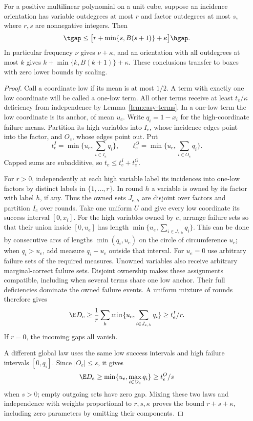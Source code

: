 \begin{theorem}\label{thm:incidence-orientation}
For a positive multilinear polynomial on a unit cube, suppose an incidence
orientation has variable outdegrees at most $r$ and factor outdegrees at
most $s$, where $r,s$ are nonnegative integers. Then
\[
 \tgap\le\bigl[r+\min\{s,B(s+1)\}+\kappa\bigr]\hgap.
\]
In particular frequency $\nu$ gives $\nu+\kappa$, and an orientation with
all outdegrees at most $k$ gives $k+\min\{k,B(k+1)\}+\kappa$.
These conclusions transfer to boxes with zero lower bounds by scaling.
\end{theorem}
\begin{proof}
Call a coordinate low if its mean is at most $1/2$. A term with exactly
one low coordinate will be called a one-low term. All other terms receive
at least $t_e/\kappa$ deficiency from independence by
Lemma~\ref{lem:easy-terms}. In a one-low term the low coordinate is its
anchor, of mean $u_e$. Write $q_i=1-x_i$ for the high-coordinate failure
means. Partition its high variables into $I_e$, whose incidence edges
point into the factor, and $O_e$, whose edges point out. Put
\[
 t_e^I=\min\{u_e,\sum_{i\in I_e}q_i\},\qquad
 t_e^O=\min\{u_e,\sum_{i\in O_e}q_i\}.
\]
Capped sums are subadditive, so $t_e\le t_e^I+t_e^O$.

For $r>0$, independently at each high variable label its incidences into
one-low factors by distinct labels in $\{1,\ldots,r\}$. In round $h$ a
variable is owned by its factor with label $h$, if any. Thus the owned
sets $J_{e,h}$ are disjoint over factors and partition $I_e$ over rounds.
Take one uniform $U$ and give every low coordinate its success interval
$[0,x_i]$. For the high variables owned by $e$, arrange failure sets so
that their union inside $[0,u_e]$ has length
$\min\{u_e,\sum_{i\in J_{e,h}}q_i\}$. This can be done by consecutive
arcs of lengths $\min(q_i,u_e)$ on the circle of circumference $u_e$;
when $q_i>u_e$, add measure $q_i-u_e$ outside that interval. For $u_e=0$
use arbitrary failure sets of the required measures. Unowned variables
also receive arbitrary marginal-correct failure sets. Disjoint ownership
makes these assignments compatible, including when several terms share
one low anchor. Their full deficiencies dominate the owned failure events.
A uniform mixture of rounds therefore gives
\[
 \E D_e\ge\frac1r\sum_h\min\{u_e,\sum_{i\in J_{e,h}}q_i\}
 \ge t_e^I/r.
\]
If $r=0$, the incoming gaps all vanish.

A different global law uses the same low success intervals and high
failure intervals $[0,q_i]$. Since $|O_e|\le s$, it gives
\[
 \E D_e\ge\min\{u_e,\max_{i\in O_e}q_i\}\ge t_e^O/s
\]
when $s>0$; empty outgoing sets have zero gap. Mixing these two laws and
independence with weights proportional to $r,s,\kappa$ proves the bound
$r+s+\kappa$, including zero parameters by omitting their components.


\end{proof}
